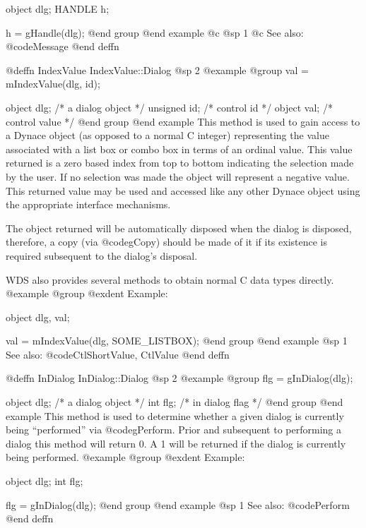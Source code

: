 object  dlg;
HANDLE  h;

h = gHandle(dlg);
@end group
@end example
@c @sp 1
@c See also:  @code{Message}
@end deffn








@deffn {IndexValue} IndexValue::Dialog
@sp 2
@example
@group
val = mIndexValue(dlg, id);

object  dlg;    /*  a dialog object  */
unsigned id;    /*  control id       */
object  val;    /*  control value    */
@end group
@end example
This method is used to gain access to a Dynace object (as opposed to a
normal C integer) representing the value associated with a list box or
combo box in terms of an ordinal value. This value returned is a zero
based index from top to bottom indicating the selection made by the
user.  If no selection was made the object will represent a negative
value.  This returned value may be used and accessed like any other
Dynace object using the appropriate interface mechanisms.

The object returned will be automatically disposed when the dialog is
disposed, therefore, a copy (via @code{gCopy}) should be made of it if
its existence is required subsequent to the dialog's disposal.

WDS also provides several methods to obtain normal C data types directly.
@example
@group
@exdent Example:

object  dlg, val;

val = mIndexValue(dlg, SOME_LISTBOX);
@end group
@end example
@sp 1
See also:  @code{CtlShortValue, CtlValue}
@end deffn








@deffn {InDialog} InDialog::Dialog
@sp 2
@example
@group
flg = gInDialog(dlg);

object  dlg;    /*  a dialog object  */
int     flg;    /*  in dialog flag   */
@end group
@end example
This method is used to determine whether a given dialog is currently
being ``performed'' via @code{gPerform}.  Prior and subsequent to
performing a dialog this method will return 0.  A 1 will be returned
if the dialog is currently being performed.
@example
@group
@exdent Example:

object  dlg;
int     flg;

flg = gInDialog(dlg);
@end group
@end example
@sp 1
See also:  @code{Perform}
@end deffn















